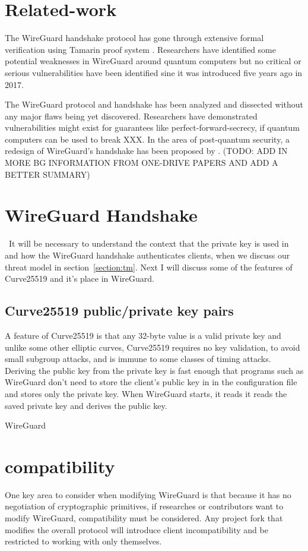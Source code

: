 \documentclass [11pt, proquest] {uwthesis}[2020/02/24]
\begin{document}
\section {Related-work}
The WireGuard handshake protocol has gone through extensive formal verification using Tamarin proof system \cite{donenfeld_formal_2018}. Researchers have identified some potential weaknesses in WireGuard around quantum computers but no critical or serious vulnerabilities have been identified sine it was introduced five years ago in 2017.

The WireGuard protocol and handshake has been analyzed and dissected without any major flaws being yet discovered. Researchers have demonstrated vulnerabilities might exist for guarantees like perfect-forward-secrecy, if quantum computers can be used to break XXX.  In the area of post-quantum security, a redesign of WireGuard's handshake has been proposed by \cite{hulsing_post-quantum_2021}.
(TODO: ADD IN MORE BG INFORMATION FROM ONE-DRIVE PAPERS AND ADD A BETTER SUMMARY)

\section {WireGuard Handshake}
\ It will be necessary to understand the context that the private key is used in and how the WireGuard handshake authenticates clients, when we discuss our threat model in section~\ref{section:tm}. Next I will discuss some of the features of Curve25519 and it's place in WireGuard.
\subsection{Curve25519 public/private key pairs}
A feature of Curve25519 is that any 32-byte value is a valid private key and unlike some other elliptic curves, Curve25519 requires no key validation, to avoid small subgroup attacks, and is immune to some classes of timing attacks\cite{noauthor_safecurves_2022}\cite{sasdrich_implementing_2015}.  Deriving the public key from the private key is fast enough that programs such as WireGuard don't need to store the client's public key in in the configuration file and stores only the private key. When WireGuard starts, it reads it reads the saved private key and derives the public key. 

WireGuard 

\section{compatibility}
One key area to consider when modifying WireGuard is that because it has no negotiation of cryptographic primitives, if researches or contributors want to modify WireGuard, compatibility must be considered. Any project fork that modifies the overall protocol will introduce client incompatibility and be restricted to working with only themselves.
\end{document}
